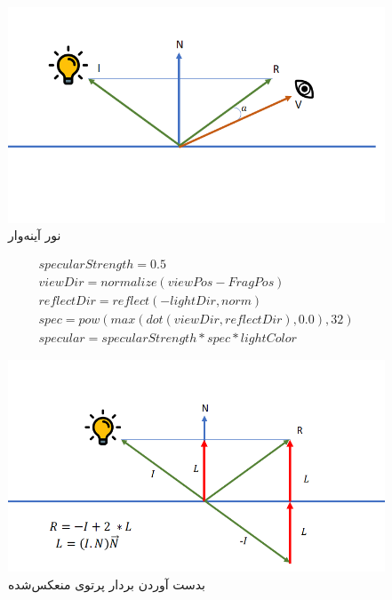 \begin{figure}[ht]
	\centerline{\includegraphics[width=\textwidth,height=\textheight,keepaspectratio]{Figures/Ch5/SpecularLight_1.png}}

	\caption{نور آینه‌وار}
	\label{fig:SpecularLight_1}
\end{figure}
  

\begin{gather*}
	specularStrength = 0.5 \\
	viewDir = normalize(viewPos - FragPos) \\
	reflectDir = reflect(-lightDir, norm) \\
	spec = pow(max(dot(viewDir, reflectDir), 0.0), 32) \\
	specular = specularStrength * spec * lightColor
\end{gather*}




\begin{figure}[ht]
	\centerline{\includegraphics[width=\textwidth,height=\textheight,keepaspectratio]{Figures/Ch5/SpecularLight_2.png}}

	\caption{بدست آوردن بردار پرتوی منعکس‌شده}
	\label{fig:SpecularLight_2}
\end{figure}


